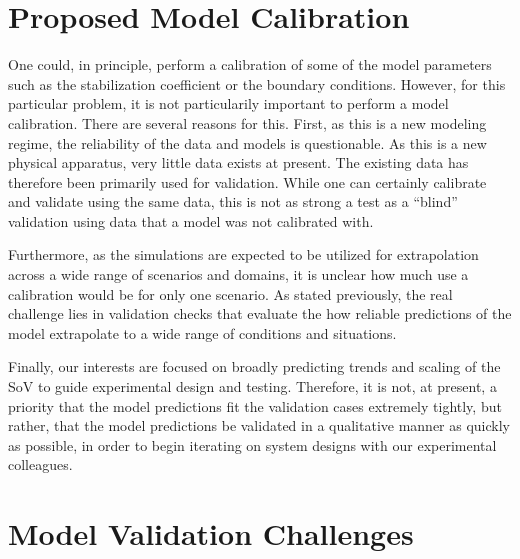 \documentclass{article}
\begin{document}
%
%

\section{Proposed Model Calibration}

One could, in principle, perform a calibration of some of the model
parameters such as the stabilization coefficient or the boundary
conditions. However, for this particular problem, it is not particularily important to
perform a model calibration. There are several reasons for this. First,
as this is a new modeling regime, the reliability of the data and models
is questionable. As this is a new physical apparatus, very little data
exists at present. The existing data has therefore been
primarily used for validation. While one can certainly
calibrate and validate using the same data, this is not as strong a test 
as a ``blind'' validation using data that a model was not calibrated with. 

Furthermore, as the simulations are expected to be utilized for
extrapolation across a wide range of scenarios and domains, it is
unclear how much use a calibration would be for only one scenario. As
stated previously, the real challenge lies in validation checks that
evaluate the how reliable predictions of the model extrapolate to a wide
range of conditions and situations. 

Finally, our interests are focused on broadly predicting trends and
scaling of the SoV to guide experimental design and testing. Therefore,
it is not, at present, a priority that the model predictions fit the validation
cases extremely tightly, but rather, that the model predictions be
validated in a qualitative manner as quickly as possible, in order to
begin iterating on system designs with our experimental colleagues. 

%
%
\section{Model Validation Challenges}
\end{document}
